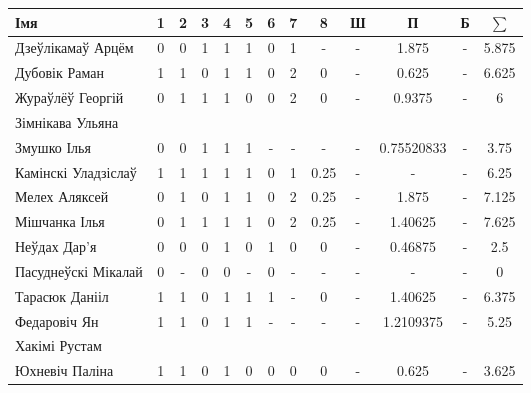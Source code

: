 \begin{table}[H]
	\begin{minipage}{\textwidth}
		\begin{tabular}{|l|c|c|c|c|c|c|c|c|c|c|c|c|}
			\hline
			Імя                 &  1   & 2 & 3 &   4   &  5   & 6 &  7   &  8   &   Ш   & П &  Б   & $\sum$ \\ \hline
			Дзеўлікамаў Арцём   & 0    & 0 & 1 & 1 & 1 & 0  & 1    &  -   & -  & 1.875 & -    &  5.875 \\ \hline
			Дубовік Раман       &  1   & 1 & 0 & 1 & 1    & 0 & 2    & 0    & -     & 0.625 & -    &  6.625 \\ \hline
			Жураўлёў Георгій    &  0   & 1 & 1 & 1  & 0    & 0 & 2 & 0    & -     & 0.9375 &  -   &   6  \\ \hline
			Зімнікава Ульяна    &     &  &  &   &     &  &     &     &      &  &     &    \\ \hline
			Змушко Ілья         &  0   & 0 & 1 & 1  & 1    & - & - & -    & - & 0.75520833 & - &  3.75 \\ \hline
			Камінскі Уладзіслаў &  1   & 1 & 1 &   1   &  1   & 0 &  1   &  0.25   &   -   & - &  -   &   6.25    \\ \hline
			Мелех Аляксей       &  0   & 1 & 0 & 1  & 1    & 0 & 2    & 0.25 &  -   &  1.875 & -  &   7.125  \\ \hline
			Мішчанка Ілья       &  0   & 1 & 1 & 1     & 1    & 0  & 2 & 0.25    & -  & 1.40625 & -    &   7.625    \\ \hline
			Неўдах Дар'я        &  0   & 0 & 0 & 1 & 0 & 1 & 0 & 0 & -     & 0.46875 &  -   & 2.5      \\ \hline
			Пасуднеўскі Мікалай & 0  & - & 0 &  0    &  -   & 0 &  -   &  -   &  -    & - & -    &  0  \\ \hline
			Тарасюк Данііл      &   1  & 1 & 0 &  1    &  1   & 1 & - &  0   & - & 1.40625 &  -   &  6.375 \\ \hline
			Федаровіч Ян        &  1   & 1 & 0 &   1   &  1   & - &  -   &  -   &   -   & 1.2109375 &  -   &   5.25    \\ \hline
			Хакімі Рустам       &     &  &  &   &  &  &     &     &      &  &     &       \\ \hline
			Юхневіч Паліна      &  1   & 1 & 0 &  1    & 0 & 0 & 0 & 0 &  -    & 0.625 &  -  &  3.625  \\ \hline
		\end{tabular}
	\end{minipage}
\end{table}


